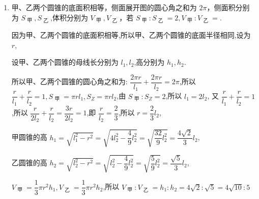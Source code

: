 \begin{enumerate}
    \item 甲、乙两个圆锥的底面积相等，侧面展开图的圆心角之和为 ${2\pi }$，侧面积分别为 ${S}_{\text{ 甲 }},{S}_{\text{ 乙 }}$,体积分别为 ${V}_{\text{ 甲 }},{V}_{\text{ 乙 }}$，若 ${S}_{\text{ 甲 }} : {S}_{\text{ 乙 }} = 2,{V}_{\text{ 甲 }} : {V}_{\text{ 乙 }} =$.
    \begin{jieda}
        因为甲、乙两个圆锥的底面积相等,所以甲、乙两个圆锥的底面半径相同,设为 $r$,
        
        设甲、乙两个圆锥的母线长分别为 ${l}_{1},{l}_{2}$,高分别为 ${h}_{1},{h}_{2}$.
        
        所以甲、乙两个圆锥的圆心角之和为: $\dfrac{2\pi r}{{l}_{1}} + \dfrac{2\pi r}{{l}_{2}} = {2\pi }$,所以 $\dfrac{r}{{l}_{1}} + \dfrac{r}{{l}_{2}} = 1,{S}_{\text{ 甲 }} = {\pi r}{l}_{1},{S}_{Z} = {\pi r}{l}_{2}$,由 ${S}_{\text{ 甲 }} : {S}_{Z} = 2$,所以 ${l}_{1} = 2{l}_{2}$, 又 $\dfrac{r}{{l}_{1}} + \dfrac{r}{{l}_{2}} = 1$,所以 $\dfrac{r}{2{l}_{2}} + \dfrac{r}{{l}_{2}} = \dfrac{3r}{2{l}_{2}} = 1$,即 $\dfrac{r}{{l}_{2}} = \dfrac{2}{3}$,所以 $r = \dfrac{2}{3}{l}_{2}$,
        
        甲圆锥的高 ${h}_{1} = \sqrt{{l}_{1}^{2} - {r}^{2}} = \sqrt{4{l}_{2}^{2} - \dfrac{4}{9}{l}_{2}^{2}} = \sqrt{\dfrac{32}{9}{l}_{2}^{2}} = \dfrac{4\sqrt{2}}{3}{l}_{2}$,
        
        乙圆锥的高 ${h}_{2} = \sqrt{{l}_{2}^{2} - {r}^{2}} = \sqrt{{l}_{2}^{2} - \dfrac{4}{9}{l}_{2}^{2}} = \sqrt{\dfrac{5}{9}{l}_{2}^{2}} = \dfrac{\sqrt{5}}{3}{l}_{2}$,
        
        ${V}_{\text{ 甲 }} = \dfrac{1}{3}\pi {r}^{2}{h}_{1},{V}_{\text{ 乙 }} = \dfrac{1}{3}\pi {r}^{2}{h}_{2}$,所以 ${V}_{\text{ 甲 }} : {V}_{\text{ 乙 }} = {h}_{1} : {h}_{2} = 4\sqrt{2} : \sqrt{5} = 4\sqrt{10} : 5$
    \end{jieda}
\end{enumerate}
